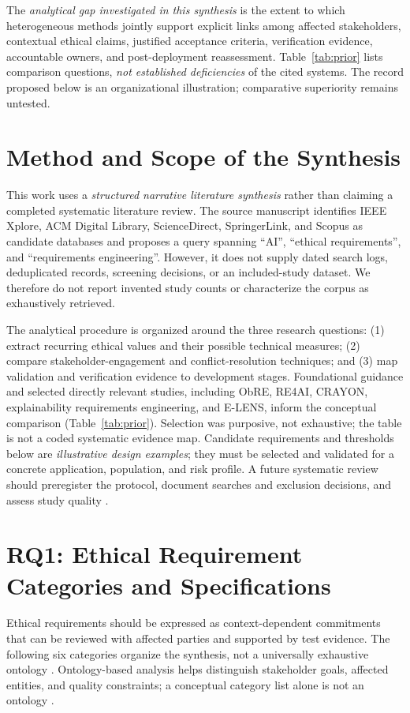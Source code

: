 \documentclass[11pt,a4paper]{article}
\begin{document}
The \emph{analytical gap investigated in this synthesis} is the extent to which heterogeneous methods jointly support explicit links among affected stakeholders, contextual ethical claims, justified acceptance criteria, verification evidence, accountable owners, and post-deployment reassessment. Table~\ref{tab:prior} lists comparison questions, \emph{not established deficiencies} of the cited systems. The record proposed below is an organizational illustration; comparative superiority remains untested.

\section{Method and Scope of the Synthesis}
This work uses a \emph{structured narrative literature synthesis} rather than claiming a completed systematic literature review. The source manuscript identifies IEEE Xplore, ACM Digital Library, ScienceDirect, SpringerLink, and Scopus as candidate databases and proposes a query spanning ``AI'', ``ethical requirements'', and ``requirements engineering''. However, it does not supply dated search logs, deduplicated records, screening decisions, or an included-study dataset. We therefore do not report invented study counts or characterize the corpus as exhaustively retrieved.

The analytical procedure is organized around the three research questions: (1) extract recurring ethical values and their possible technical measures; (2) compare stakeholder-engagement and conflict-resolution techniques; and (3) map validation and verification evidence to development stages. Foundational guidance and selected directly relevant studies, including ObRE, RE4AI, CRAYON, explainability requirements engineering, and E-LENS, inform the conceptual comparison (Table~\ref{tab:prior}). Selection was purposive, not exhaustive; the table is not a coded systematic evidence map. Candidate requirements and thresholds below are \emph{illustrative design examples}; they must be selected and validated for a concrete application, population, and risk profile. A future systematic review should preregister the protocol, document searches and exclusion decisions, and assess study quality \cite{kitchenham2007,braun2006}.

\section{RQ1: Ethical Requirement Categories and Specifications}
Ethical requirements should be expressed as context-dependent commitments that can be reviewed with affected parties and supported by test evidence. The following six categories organize the synthesis, not a universally exhaustive ontology \cite{hleg2019,jobin2019}. Ontology-based analysis helps distinguish stakeholder goals, affected entities, and quality constraints; a conceptual category list alone is not an ontology \cite{guizzardi2023}.
\end{document}
